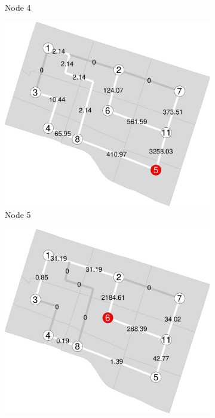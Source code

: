 \documentclass[]{elsarticle} %
\begin{document}
\begin{figure}
\begin{subfigure}{0.32\textwidth}
  \caption{Node 4}
\end{subfigure}
\begin{subfigure}{0.32\textwidth}
  \centering
  \includegraphics[width=1\linewidth]{Plots/sp5.pdf}  
  \caption{Node 5}
\end{subfigure}
\begin{subfigure}{0.32\textwidth}
  \centering
  \includegraphics[width=1\linewidth]{Plots/sp6.pdf}  

\end{subfigure}
\end{figure}
\end{document}
